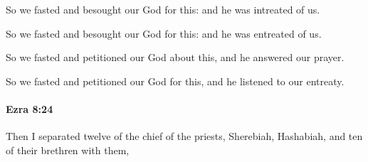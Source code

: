 			So we fasted and besought our God for this: and he was intreated of us.

			\begin{versebox}
					\item[BHS] 
					\item[LXX] 
					\item[ASV] So we fasted and besought our God for this: and he was entreated of us.
					\item[NIV] So we fasted and petitioned our God about this, and he answered our prayer.
					\item[NRSV] So we fasted and petitioned our God for this, and he listened to our entreaty.
			\end{versebox}

		\paragraph{Ezra 8:24} %
			\label{EZRA-8-24}

			Then I separated twelve of the chief of the priests, Sherebiah, Hashabiah, and ten of their brethren with them,

